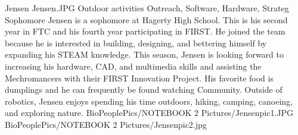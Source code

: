 \insertbio
{Jensen}
{Jensen.JPG}
{Outdoor activities}
{Outreach, Software, Hardware, Strateg}
{Sophomore}
{
Jensen is a sophomore at Hagerty High School. This is his second year in FTC and his fourth year participating in FIRST. He joined the team because he is interested in building, designing, and bettering himself by expanding his STEAM knowledge. This season, Jensen is looking forward to increasing his hardware, CAD, and multimedia skills and assisting the Mechromancers with their FIRST Innovation Project. His favorite food is dumplings and he can frequently be found watching Community. Outside of robotics, Jensen enjoys spending his time outdoors, hiking, camping, canoeing, and exploring nature. 
}
{BioPeoplePics/NOTEBOOK 2 Pictures/Jensenpic1.JPG}
{BioPeoplePics/NOTEBOOK 2 Pictures/Jensenpic2.jpg}
